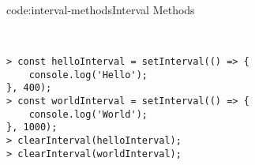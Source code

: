 \begin{codeenv}{code:interval-methods}{Interval Methods}\begin{verbatim}


> const helloInterval = setInterval(() => {
    console.log('Hello');
}, 400);
> const worldInterval = setInterval(() => {
    console.log('World');
}, 1000);
> clearInterval(helloInterval);
> clearInterval(worldInterval);
\end{verbatim}
\end{codeenv}
